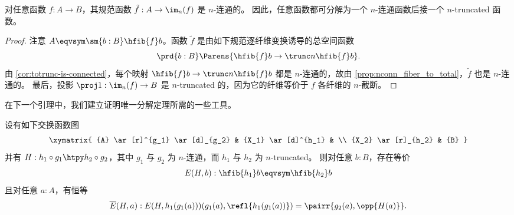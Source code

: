 \begin{lem}\label{prop:to_image_is_connected}
对任意函数 $f:A\to B$，其规范函数 $\tilde{f}:A\to\im_n(f)$ 是 $n$-连通的。
因此，任意函数都可分解为一个 $n$-连通函数后接一个 $n$-truncated 函数。
\end{lem}

\begin{proof}
注意 $A\eqvsym\sm{b:B}\hfib{f}b$。函数 $\tilde{f}$ 是由如下规范逐纤维变换诱导的总空间函数
\begin{equation*}
\prd{b:B} \Parens{\hfib{f}b\to\trunc n{\hfib{f}b}}.
\end{equation*}
由 \cref{cor:totrunc-is-connected}，每个映射 $\hfib{f}b\to\trunc n{\hfib{f}b}$ 都是 $n$-连通的，故由 \cref{prop:nconn_fiber_to_total}，$\tilde{f}$ 也是 $n$-连通的。
最后，投影 $\proj1:\im_n(f) \to B$ 是 $n$-truncated 的，因为它的纤维等价于 $f$ 各纤维的 $n$-截断。
\end{proof}

在下一个引理中，我们建立证明唯一分解定理所需的一些工具。

\begin{lem}\label{prop:factor_equiv_fiber}
设有如下交换函数图
\begin{equation*}
  \xymatrix{
    {A} \ar[r]^{g_1} \ar[d]_{g_2} &
    {X_1} \ar[d]^{h_1} &
    \\
    {X_2} \ar[r]_{h_2}
    &
    {B}
  }
\end{equation*}
并有 $H:h_1\circ g_1\htpy h_2\circ g_2$，其中 $g_1$ 与 $g_2$ 为 $n$-连通，而 $h_1$ 与 $h_2$ 为 $n$-truncated。
则对任意 $b:B$，存在等价
\begin{equation*}
E(H,b):\hfib{h_1}b\eqvsym\hfib{h_2}b
\end{equation*}
且对任意 $a:A$，有恒等
\[\overline{E}(H,a) :  E(H,h_1(g_1(a)))({g_1(a),\refl{h_1(g_1(a))}}) = \pairr{g_2(a),\opp{H(a)}}.\]
\end{lem}

